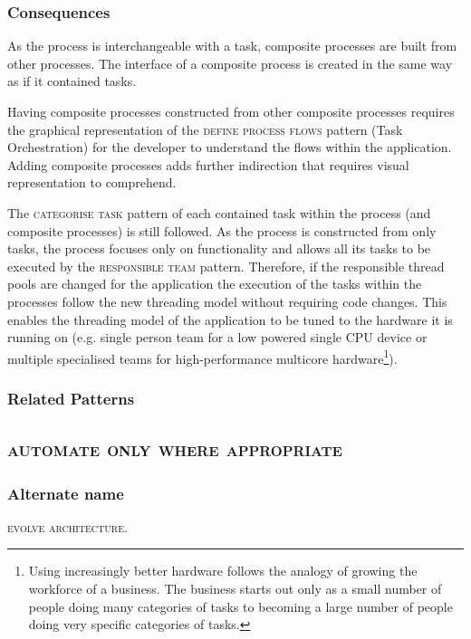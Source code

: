 \documentclass[prodmode]{style/acmlarge}
\begin{document}
\subsubsection*{Consequences} As the process is interchangeable with a task,
composite processes are built from other processes.  The interface of a
composite process is created in the same way as if it contained tasks.

Having composite processes constructed from other composite processes requires
the graphical representation of the \textsc{define process flows} pattern (Task
Orchestration) for the developer to understand the flows within the application.
 Adding composite processes adds further indirection that requires visual
representation to comprehend.

The \textsc{categorise task} pattern of each contained task within the process
(and composite processes) is still followed.  As the process is constructed from
only tasks, the process focuses only on functionality and allows all its tasks
to be executed by the \textsc{responsible team} pattern.  Therefore, if the
responsible thread pools are changed for the application the execution of the
tasks within the processes follow the new threading model without requiring code
changes.  This enables the threading model of the application to be tuned to the
hardware it is running on (e.g. single person team for a low powered single CPU
device or multiple specialised teams for high-performance multicore
hardware\footnote{Using increasingly better hardware follows the analogy of
growing the workforce of a business.  The business starts out only as a small
number of people doing many categories of tasks to becoming a large number of
people doing very specific categories of tasks.}).

\subsubsection*{Related Patterns}



\subsection{\textsc{\textbf{automate only where appropriate}}}

\subsubsection*{Alternate name} \textsc{evolve architecture}.
\end{document}
